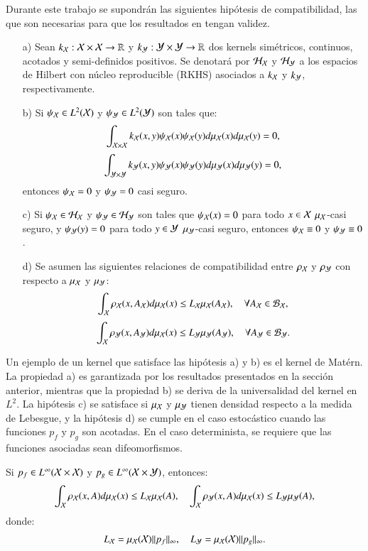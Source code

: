 Durante este trabajo se supondrán las siguientes hipótesis de compatibilidad, las que son necesarias para que los resultados en \cite{Philipp2024ErrorOperator} tengan validez.
\begin{enumerate}
    \item[a)] Sean $k_{\mathcal{X}}:\mathcal{X} \times \mathcal{X} \to \mathbb{R}$ y $k_{\mathcal{Y}}: \mathcal{Y} \times \mathcal{Y} \to \mathbb{R}$ dos kernels simétricos, continuos, acotados y semi-definidos positivos. Se denotará por $\mathcal{H}_{\mathcal{X}}$ y $\mathcal{H}_{\mathcal{Y}}$ a los espacios de Hilbert con núcleo reproducible (RKHS) asociados a $k_{\mathcal{X}}$ y $k_{\mathcal{Y}}$, respectivamente.
    \item[b)] Si $\psi_{\mathcal{X}} \in L^2(\mathcal{X})$ y $\psi_{\mathcal{Y}} \in L^2(\mathcal{Y})$ son tales que: 
    \[
        \int_{\mathcal{X} \times \mathcal{X}} k_{\mathcal{X}}(x,y) \psi_{\mathcal{X}} (x) \psi_{\mathcal{X}} (y) d \mu_{\mathcal{X}} (x) d \mu_{\mathcal{X}} (y) = 0, 
    \]
    \[
        \int_{\mathcal{Y} \times \mathcal{Y}} k_{\mathcal{Y}}(x,y) \psi_{\mathcal{Y}} (x) \psi_{\mathcal{Y}} (y) d \mu_{\mathcal{Y}} (x) d \mu_{\mathcal{Y}} (y) = 0, 
    \]
    entonces $\psi_{\mathcal{X}} = 0$ y $\psi_{\mathcal{Y}} = 0$ casi seguro.
    \item[c)] Si $\psi_{\mathcal{X}} \in \mathcal{H}_{\mathcal{X}}$ y $\psi_{\mathcal{Y}} \in \mathcal{H}_{\mathcal{Y}}$ son tales que $\psi_{\mathcal{X}}(x) = 0$ para todo $x \in \mathcal{X}$ $\mu_{\mathcal{X}}$-casi seguro, y $\psi_{\mathcal{Y}}(y) = 0$ para todo $y \in \mathcal{Y}$ $\mu_{\mathcal{Y}}$-casi seguro, entonces $\psi_{\mathcal{X}} \equiv 0$ y $\psi_{\mathcal{Y}} \equiv 0$.
    \item[d)] Se asumen las siguientes relaciones de compatibilidad entre $\rho_{\mathcal{X}}$ y $\rho_{\mathcal{Y}}$ con respecto a $\mu_{\mathcal{X}}$ y $\mu_{\mathcal{Y}}$:
    \[
        \int_{\mathcal{X}} \rho_{\mathcal{X}} (x, A_{\mathcal{X}}) d\mu_{\mathcal{X}} (x) \leq L_{\mathcal{X}} \mu_{\mathcal{X}} (A_{\mathcal{X}}), \quad \forall A_{\mathcal{X}} \in \mathcal{B}_{\mathcal{X}},
    \]
    \[
        \int_{\mathcal{X}} \rho_{\mathcal{Y}} (x, A_{\mathcal{Y}}) d\mu_{\mathcal{X}} (x) \leq L_{\mathcal{Y}} \mu_{\mathcal{Y}} (A_{\mathcal{Y}}), \quad \forall A_{\mathcal{Y}} \in \mathcal{B}_{\mathcal{Y}}.
    \]
\end{enumerate}

Un ejemplo de un kernel que satisface las hipótesis a) y b) es el kernel de Matérn. La propiedad a) es garantizada por los resultados presentados en la sección anterior, mientras que la propiedad b) se deriva de la universalidad del kernel en $L^2$. 
La hipótesis c) se satisface si $\mu_{\mathcal{X}}$ y $\mu_{\mathcal{Y}}$ tienen densidad respecto a la medida de Lebesgue, y la hipótesis d) se cumple en el caso estocástico cuando las funciones $p_f$ y $p_g$ son acotadas. En el caso determinista, se requiere que las funciones asociadas sean difeomorfismos.

\begin{prop}
    Si $p_f \in L^{\infty} (\mathcal{X} \times \mathcal{X})$ y $p_g \in L^{\infty} (\mathcal{X} \times \mathcal{Y})$, entonces:
    \[
        \int_{\mathcal{X}} \rho_{\mathcal{X}} (x, A) d\mu_{\mathcal{X}} (x) \leq L_{\mathcal{X}} \mu_{\mathcal{X}} (A), \quad \int_{\mathcal{X}} \rho_{\mathcal{Y}} (x, A) d\mu_{\mathcal{X}} (x) \leq L_{\mathcal{Y}} \mu_{\mathcal{Y}} (A),
    \]
    donde:
    \[
        L_{\mathcal{X}} = \mu_{\mathcal{X}} (\mathcal{X}) \| p_f \|_\infty, \quad L_{\mathcal{Y}} = \mu_{\mathcal{X}} (\mathcal{X}) \| p_g \|_\infty.
    \]
\end{prop}

